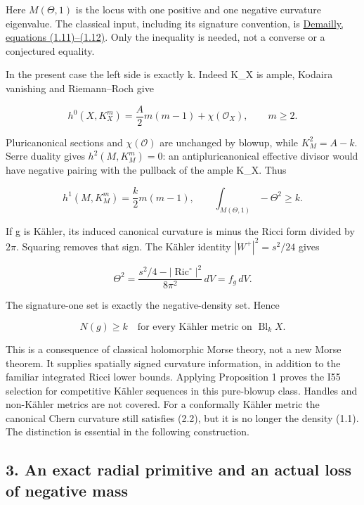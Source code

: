 \documentclass[
  10pt,
]{article}
\begin{document}
Here \(M(\Theta,1)\) is the locus with one positive and one negative
curvature eigenvalue. The classical input, including its signature
convention, is \href{https://arxiv.org/html/1003.5067}{Demailly,
equations (1.11)--(1.12)}. Only the inequality is needed, not a converse
or a conjectured equality.

In the present case the left side is exactly k. Indeed K\_X is ample,
Kodaira vanishing and Riemann--Roch give

\[
 h^0(X,K_X^m)=\frac{A}{2}m(m-1)+\chi(\mathcal O_X),\qquad m\ge2.
\]

Pluricanonical sections and \(\chi(\mathcal O)\) are unchanged by
blowup, while \(K_M^2=A-k\). Serre duality gives \(h^2(M,K_M^m)=0\): an
antipluricanonical effective divisor would have negative pairing with
the pullback of the ample K\_X. Thus

\[
 h^1(M,K_M^m)=\frac{k}{2}m(m-1),\qquad
 \int_{M(\Theta,1)}-\Theta^2\ge k. \tag{2.2}
\]

If g is Kähler, its induced canonical curvature is minus the Ricci form
divided by \(2\pi\). Squaring removes that sign. The Kähler identity
\(|W^+|^2=s^2/24\) gives

\[
 \Theta^2=\frac{s^2/4-|\operatorname{Ric}^{\circ}|^2}{8\pi^2}\,dV
          =f_g\,dV.
\]

The signature-one set is exactly the negative-density set. Hence

\[
 \boxed{N(g)\ge k\quad\text{for every Kähler metric on }\operatorname{Bl}_k X.}
 \tag{2.3}
\]

This is a consequence of classical holomorphic Morse theory, not a new
Morse theorem. It supplies spatially signed curvature information, in
addition to the familiar integrated Ricci lower bounds. Applying
Proposition 1 proves the I55 selection for competitive Kähler sequences
in this pure-blowup class. Handles and non-Kähler metrics are not
covered. For a conformally Kähler metric the canonical Chern curvature
still satisfies (2.2), but it is no longer the density (1.1). The
distinction is essential in the following construction.

\hypertarget{an-exact-radial-primitive-and-an-actual-loss-of-negative-mass}{%
\subsection{3. An exact radial primitive and an actual loss of negative
mass}\label{an-exact-radial-primitive-and-an-actual-loss-of-negative-mass}}
\end{document}
